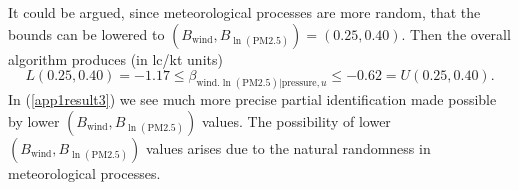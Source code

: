 \documentclass[11pt]{amsart}
\begin{document}
It could be argued, since meteorological processes are more random, that the bounds can be lowered to $(B_{\textrm{wind}},B_{\ln(\textrm{PM2.5})})=(0.25,0.40)$. Then the overall algorithm produces (in lc/kt units)
\begin{equation}\label{app1result3}
L(0.25,0.40)=
-1.17\le\beta_{\textrm{wind}.\ln(\textrm{PM2.5})|\textrm{pressure},u}\le -0.62
=
U(0.25,0.40).\end{equation} In (\ref{app1result3}) we see much more precise partial identification made possible by lower $(B_{\textrm{wind}},B_{\ln(\textrm{PM2.5})})$ values. The possibility of lower $(B_{\textrm{wind}},B_{\ln(\textrm{PM2.5})})$ values arises due to the natural randomness in meteorological processes. 
\end{document}
